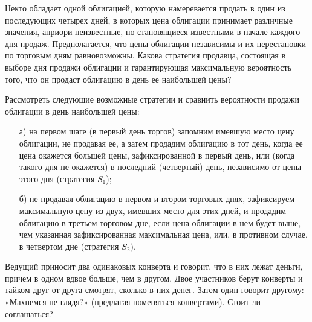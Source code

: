 \begin{problem}
Некто обладает одной облигацией, которую намеревается продать в один из последующих четырех дней, в которых цена облигации 
принимает различные значения, априори неизвестные, но становящиеся известными в начале каждого дня продаж. Предполагается, что 
цены облигации независимы и их перестановки по торговым дням равновозможны. Какова стратегия продавца, состоящая в выборе дня 
продажи облигации и гарантирующая максимальную вероятность того, что он продаст облигацию в день ее наибольшей цены? 
\end{problem}

\begin{ordre}
Рассмотреть следующие возможные стратегии и сравнить вероятности продажи облигации в день наибольшей цены: 
\begin{enumerate}
\item[а)] на первом шаге (в первый день торгов) запомним имевшую место цену облигации, не продавая ее, а затем продадим 
облигацию в тот день, когда ее цена окажется большей цены, зафиксированной в первый день, или (когда такого дня не окажется) в 
последний (четвертый) день, независимо от цены этого дня (стратегия $S_1$); 

\item[б)] не продавая облигацию в первом и втором торговых днях, зафиксируем  максимальную цену из двух, имевших место для этих дней, 
и продадим облигацию в третьем торговом дне, если цена облигации в нем будет выше, чем указанная зафиксированная максимальная цена, 
или, в противном случае, в четвертом дне (стратегия $S_2$). 
\end{enumerate}
\end{ordre}


\begin{problem}
Ведущий приносит два одинаковых конверта и говорит, что в них лежат деньги, причем в одном вдвое больше, чем в другом. Двое участников берут конверты и тайком друг от друга смотрят, сколько в них денег. Затем один говорит другому: «Махнемся не глядя?» (предлагая поменяться конвертами). Стоит ли соглашаться?
\end{problem}


